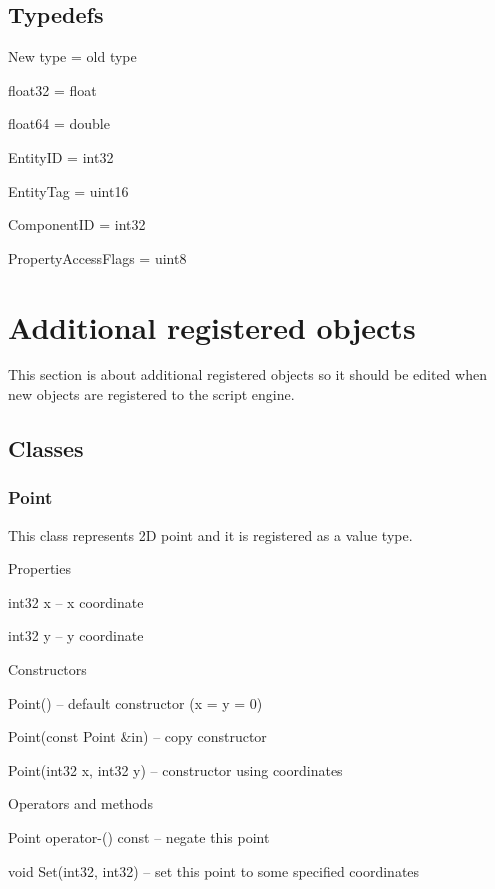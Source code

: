 \subsection{Typedefs}

\begin{titled-itemize}{New type = old type}
  \item float32 = float
  \item float64 = double
  \item EntityID = int32
  \item EntityTag = uint16
  \item ComponentID = int32
  \item PropertyAccessFlags = uint8
\end{titled-itemize}

\section{Additional registered objects}

This section is about additional registered objects so it should be edited when new objects are registered to the script engine.

\subsection{Classes}

\subsubsection{Point}

This class represents 2D point and it is registered as a value type.

\begin{titled-itemize}{Properties}
  \item int32 x -- x coordinate
  \item int32 y -- y coordinate
\end{titled-itemize}

\begin{titled-itemize}{Constructors}
  \item Point() -- default constructor (x = y = 0)
  \item Point(const Point \&in) -- copy constructor
  \item Point(int32 x, int32 y)  -- constructor using coordinates
\end{titled-itemize}

\begin{titled-itemize}{Operators and methods}
  \item Point operator-() const -- negate this point
  \item void Set(int32, int32) -- set this point to some specified coordinates
\end{titled-itemize}

